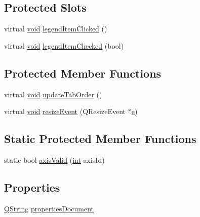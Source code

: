 \subsection*{Protected Slots}
\begin{DoxyCompactItemize}
\item 
virtual \hyperlink{group___u_a_v_objects_plugin_ga444cf2ff3f0ecbe028adce838d373f5c}{void} \hyperlink{class_qwt_plot_ae1b53fe373a12b1558fca37fdc2f0a54}{legend\-Item\-Clicked} ()
\item 
virtual \hyperlink{group___u_a_v_objects_plugin_ga444cf2ff3f0ecbe028adce838d373f5c}{void} \hyperlink{class_qwt_plot_ad41768a65a7cc426091c89d54e3c2ab2}{legend\-Item\-Checked} (bool)
\end{DoxyCompactItemize}
\subsection*{Protected Member Functions}
\begin{DoxyCompactItemize}
\item 
virtual \hyperlink{group___u_a_v_objects_plugin_ga444cf2ff3f0ecbe028adce838d373f5c}{void} \hyperlink{class_qwt_plot_a6455596162a69876a3504c0017531cf3}{update\-Tab\-Order} ()
\item 
virtual \hyperlink{group___u_a_v_objects_plugin_ga444cf2ff3f0ecbe028adce838d373f5c}{void} \hyperlink{class_qwt_plot_aa4d5f73681880b9770bb6a604c415987}{resize\-Event} (Q\-Resize\-Event $\ast$\hyperlink{_o_p_plots_8m_a9425be9aab51621e317ba7ade564b570}{e})
\end{DoxyCompactItemize}
\subsection*{Static Protected Member Functions}
\begin{DoxyCompactItemize}
\item 
static bool \hyperlink{class_qwt_plot_ac02c033b024a4ecbefcf1b0e93c91205}{axis\-Valid} (\hyperlink{ioapi_8h_a787fa3cf048117ba7123753c1e74fcd6}{int} axis\-Id)
\end{DoxyCompactItemize}
\subsection*{Properties}
\begin{DoxyCompactItemize}
\item 
\hyperlink{group___u_a_v_objects_plugin_gab9d252f49c333c94a72f97ce3105a32d}{Q\-String} \hyperlink{class_qwt_plot_a1f27a18e9f3c562fb6410ce40cdd3569}{properties\-Document}
\end{DoxyCompactItemize}


